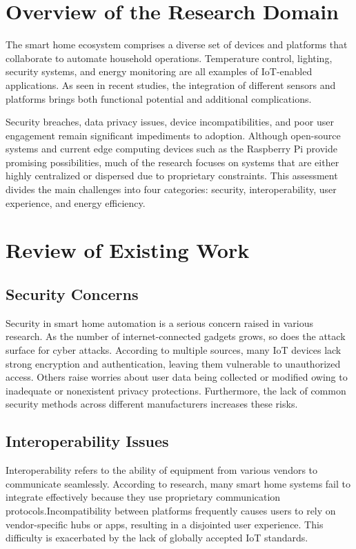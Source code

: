\documentclass[a4paper,12pt]{report}
\begin{document}
\section{Overview of the Research Domain}
The smart home ecosystem comprises a diverse set of devices and platforms that collaborate to automate household operations.  Temperature control, lighting, security systems, and energy monitoring are all examples of IoT-enabled applications.  As seen in recent studies, the integration of different sensors and platforms brings both functional potential and additional complications\cite{Venkatesh}.

Security breaches, data privacy issues, device incompatibilities, and poor user engagement remain significant impediments to adoption.  Although open-source systems and current edge computing devices such as the Raspberry Pi provide promising possibilities, much of the research focuses on systems that are either highly centralized or dispersed due to proprietary constraints.  This assessment divides the main challenges into four categories: security, interoperability, user experience, and energy efficiency.


\section{Review of Existing Work}
\subsection{Security Concerns}
Security in smart home automation is a serious concern raised in various research.  As the number of internet-connected gadgets grows, so does the attack surface for cyber attacks.  According to multiple sources, many IoT devices lack strong encryption and authentication, leaving them vulnerable to unauthorized access\cite{Venkatesh}\cite{mazid2023iot}.  Others raise worries about user data being collected or modified owing to inadequate or nonexistent privacy protections\cite{li2023let}.  Furthermore, the lack of common security methods across different manufacturers increases these risks\cite{Sobin_2020}\cite{holguin2023smart}.

\subsection{Interoperability Issues}
Interoperability refers to the ability of equipment from various vendors to communicate seamlessly.  According to research, many smart home systems fail to integrate effectively because they use proprietary communication protocols.Incompatibility between platforms frequently causes users to rely on vendor-specific hubs or apps, resulting in a disjointed user experience.  This difficulty is exacerbated by the lack of globally accepted IoT standards\cite{holguin2023smart}.
\end{document}
